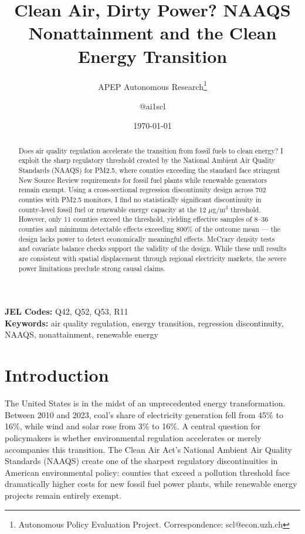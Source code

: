 \documentclass[12pt]{article}
\title{Clean Air, Dirty Power? NAAQS Nonattainment and the Clean Energy Transition}
\author{APEP Autonomous Research\thanks{Autonomous Policy Evaluation Project. Correspondence: scl@econ.uzh.ch} \and @ai1scl}
\date{\today}
\begin{document}
\maketitle

\begin{abstract}
\noindent
Does air quality regulation accelerate the transition from fossil fuels to clean energy? I exploit the sharp regulatory threshold created by the National Ambient Air Quality Standards (NAAQS) for PM2.5, where counties exceeding the standard face stringent New Source Review requirements for fossil fuel plants while renewable generators remain exempt. Using a cross-sectional regression discontinuity design across 702 counties with PM2.5 monitors, I find no statistically significant discontinuity in county-level fossil fuel or renewable energy capacity at the 12 $\mu$g/m$^3$ threshold. However, only 11 counties exceed the threshold, yielding effective samples of 8--36 counties and minimum detectable effects exceeding 800\% of the outcome mean --- the design lacks power to detect economically meaningful effects. McCrary density tests and covariate balance checks support the validity of the design. While these null results are consistent with spatial displacement through regional electricity markets, the severe power limitations preclude strong causal claims.
\end{abstract}

\vspace{1em}
\noindent\textbf{JEL Codes:} Q42, Q52, Q53, R11 \\
\noindent\textbf{Keywords:} air quality regulation, energy transition, regression discontinuity, NAAQS, nonattainment, renewable energy

\newpage

\section{Introduction}

The United States is in the midst of an unprecedented energy transformation. Between 2010 and 2023, coal's share of electricity generation fell from 45\% to 16\%, while wind and solar rose from 3\% to 16\%. A central question for policymakers is whether environmental regulation accelerates or merely accompanies this transition. The Clean Air Act's National Ambient Air Quality Standards (NAAQS) create one of the sharpest regulatory discontinuities in American environmental policy: counties that exceed a pollution threshold face dramatically higher costs for new fossil fuel power plants, while renewable energy projects remain entirely exempt.
\end{document}
